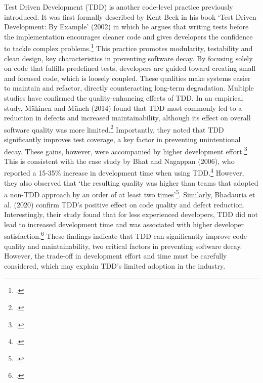 Test Driven Development (TDD) is another code-level practice previously introduced. It was first formally described by Kent Beck in his book
`Test Driven Development: By Example' (2002) in which he argues that writing tests before the implementation
encourages cleaner code and gives developers the confidence to tackle complex problems.\footcite[pp. 8-9]{beckTestdrivenDevelopmentExample2002}
This practice promotes modularity, testability and clean design, key characteristics in preventing software decay. By focusing solely on code
that fulfills predefined tests, developers are guided toward creating small and focused code, which is loosely coupled. These qualities make systems
easier to maintain and refactor, directly counteracting long-term degradation.
Multiple studies have confirmed the quality-enhancing effects of \ac{TDD}.
In an empirical study, Mäkinen and Münch (2014) found that  TDD most commonly led to a reduction in defects and increased maintainability, 
although its effect on overall software quality was more limited.\footcite[13]{inproceedings}
Importantly, they noted that TDD significantly improves test coverage, a key factor in preventing unintentional decay.
These gains, however, were accompanied by higher development effort.\footcite[13]{inproceedings}
This is consistent with the case study by Bhat and Nagappan (2006), who reported a 15-35\% increase in development time when using \ac{TDD}.\footcite[361]{bhatEvaluatingEfficacyTestdriven2006a}
However, they also observed that `the resulting quality was higher than teams that adopted a non-TDD approach by an order of at least two times'\footcite[361]{bhatEvaluatingEfficacyTestdriven2006a}.
Similarly, Bhadauria et al. (2020) confirm TDD’s positive effect on code quality and defect reduction.
Interestingly, their study found that for less experienced developers, TDD did not lead to increased development time and was associated with higher developer satisfaction.\footcite[1058]{bhadauriaPerformanceOutcomesTestDriven2020}
These findings indicate that TDD can significantly improve code quality and maintainability, two critical factors in preventing software decay.
However, the trade-off in development effort and time must be carefully considered, which may explain TDD's limited adoption in the industry.

